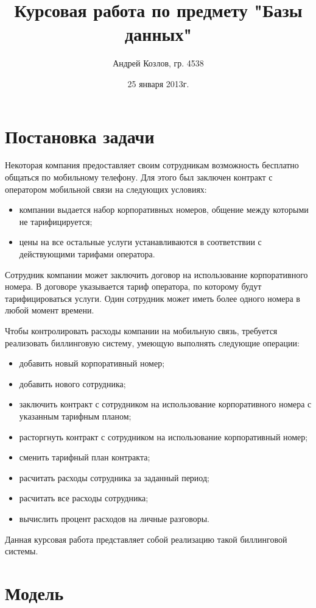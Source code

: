 \documentclass[10pt, a4paper]{article}
\title{Курсовая работа по предмету "Базы данных"}
\author{Андрей Козлов, гр. 4538}
\date{25 января 2013г.}
\begin{document}
\maketitle

\section{Постановка задачи}

Некоторая компания предоставляет своим сотрудникам возможность бесплатно общаться по мобильному телефону. Для этого был заключен контракт с оператором мобильной связи на следующих условиях:
\begin{itemize}
	\item компании выдается набор корпоративных номеров, общение между которыми не тарифицируется;
	\item цены на все остальные услуги устанавливаются в соответствии с действующими тарифами оператора.
\end{itemize}

Сотрудник компании может заключить договор на использование корпоративного номера. В договоре указывается тариф оператора, по которому будут тарифицироваться услуги. Один сотрудник может иметь более одного номера в любой момент времени.

Чтобы контролировать расходы компании на мобильную связь, требуется реализовать биллинговую систему, умеющую выполнять следующие операции:
\begin{itemize}
	 \item добавить новый корпоративный номер;
	\item добавить нового сотрудника;
	\item заключить контракт с сотрудником на использование корпоративного номера с указанным тарифным планом;
	\item расторгнуть контракт с сотрудником на использование корпоративный номер;
	\item сменить тарифный план контракта;
	\item расчитать расходы сотрудника за заданный период;
	\item расчитать все расходы сотрудника;
	\item вычислить процент расходов на личные разговоры.
\end{itemize}

Данная курсовая работа представляет собой реализацию такой биллинговой системы.

\section{Модель}
\end{document}
